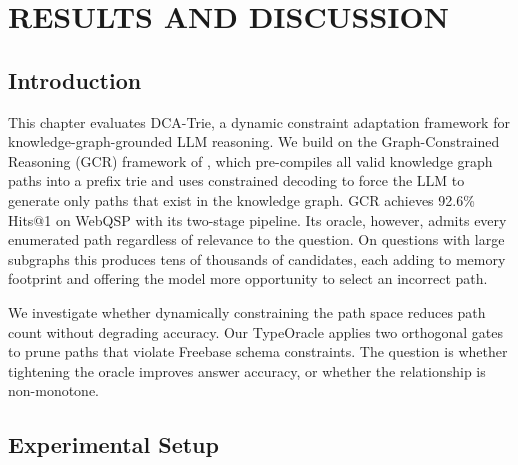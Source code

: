 
\chapter{RESULTS AND DISCUSSION}
\label{Chapter4}

\graphicspath{{chapters/introduction/figures/PNG}{chapters/introduction/figures/PDF}{chapters/introduction/figures}}


\section{Introduction}
\label{sec:ch4intro}

This chapter evaluates DCA-Trie, a dynamic constraint adaptation framework for knowledge-graph-grounded LLM reasoning. We build on the Graph-Constrained Reasoning (GCR) framework of \citet{luo2025-graph-constrained-reasoning}, which pre-compiles all valid knowledge graph paths into a prefix trie and uses constrained decoding to force the LLM to generate only paths that exist in the knowledge graph. GCR achieves 92.6\% Hits@1 on WebQSP with its two-stage pipeline. Its oracle, however, admits every enumerated path regardless of relevance to the question. On questions with large subgraphs this produces tens of thousands of candidates, each adding to memory footprint and offering the model more opportunity to select an incorrect path.

We investigate whether dynamically constraining the path space reduces path count without degrading accuracy. Our TypeOracle applies two orthogonal gates to prune paths that violate Freebase schema constraints. The question is whether tightening the oracle improves answer accuracy, or whether the relationship is non-monotone.

\section{Experimental Setup}
\label{sec:ch4setup}


